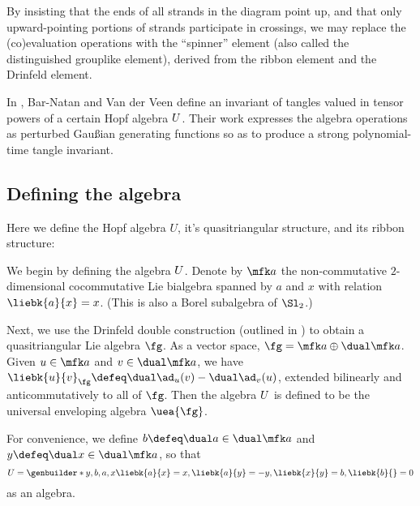 \documentclass{article}
\begin{document}


\begin{remark}
        By insisting that the ends of all strands in the diagram point up, and
        that only upward-pointing portions of strands participate in crossings,
        we may replace the (co)evaluation operations with the \enquote{spinner}
        element (also called the distinguished grouplike element), derived from
        the ribbon element and the Drinfeld element.
\end{remark}
In \cite{BV}, Bar-Natan and Van der Veen define an invariant of tangles valued
in tensor powers of a certain Hopf algebra $U$. Their work expresses the
algebra operations as perturbed Gaußian generating functions so as to produce a
strong polynomial-time tangle invariant.

\subsection{Defining the algebra}
Here we define the Hopf algebra $U$, it's quasitriangular structure, and its
ribbon structure:

We begin by defining the algebra $U$. Denote by $\fa$ the non-commutative
$2$-dimensional cocommutative Lie bialgebra spanned by $a$ and $x$ with relation
$\liebk{a}{x} = x$. (This is also a Borel subalgebra of $\Sl_2$.)

Next, we use the Drinfeld double construction (outlined in \cite{ES}) to obtain
a quasitriangular Lie algebra $\fg$. As a vector space,
$\fg = \fa \oplus \dual\fa$. Given $u \in \fa$ and $v\in \dual \fa$, we have
$\liebk{u}{v}_{\fg} \defeq \dual\ad_u(v) - \dual\ad_v(u)$, extended bilinearly
and anticommutatively to all of $\fg$.
Then the algebra $U$ is defined to be the universal enveloping algebra
$\uea{\fg}$.

\begin{remark}
        For convenience, we define $b \defeq \dual a \in \dual\fa$ and
        $y \defeq \dual x \in \dual\fa$, so that
        \begin{equation}
                U = \genbuilder*{y, b, a, x}{
                        \liebk{a}{x} = x,
                        \liebk{a}{y} = -y,
                        \liebk{x}{y} = b,
                        \liebk{b}{ } = 0
                }
        \end{equation}
        as an algebra.
\end{remark}
\end{document}
